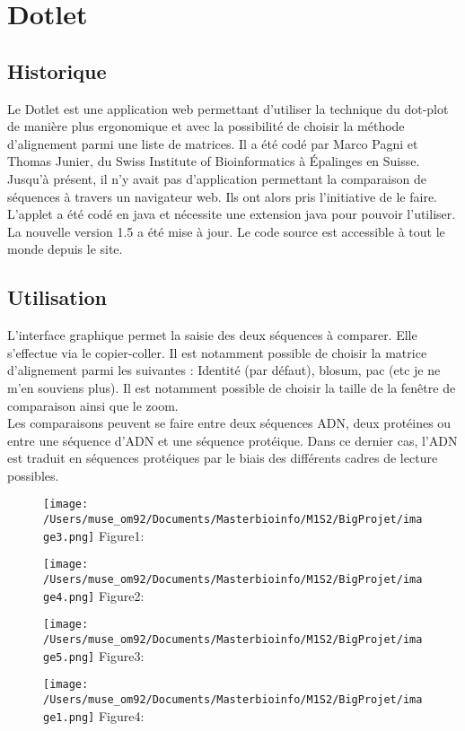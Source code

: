\documentclass{report}
\begin{document}


\chapter{Dotlet}

\section{Historique}

Le Dotlet est une application web permettant d'utiliser la technique du dot-plot de manière plus ergonomique et avec la possibilité de choisir la méthode d'alignement parmi une liste de matrices. 
Il a été codé par Marco Pagni et Thomas Junier, du Swiss Institute of Bioinformatics à Épalinges en Suisse. Jusqu'à présent, il n'y avait pas d'application permettant la comparaison de séquences à travers un navigateur web. Ils ont alors pris l'initiative de le faire.\\
L'applet a été codé en java et nécessite une extension java pour pouvoir l'utiliser. La nouvelle version 1.5 a été mise à jour. Le code source est accessible à tout le monde depuis le site.\\


\section{Utilisation}

L'interface graphique permet la saisie des deux séquences à comparer. Elle s'effectue via le copier-coller. Il est notamment possible de choisir la matrice d'alignement parmi les suivantes : Identité (par défaut), blosum, pac (etc je ne m'en souviens plus). Il est notamment possible de choisir la taille de la fenêtre de comparaison ainsi que le zoom. \\
Les comparaisons peuvent se faire entre deux séquences ADN, deux protéines ou entre une séquence d'ADN et une séquence protéique. Dans ce dernier cas, l'ADN est traduit en séquences protéiques par le biais des différents cadres de lecture possibles.\\

\begin{figure}[!h]
\centering
\texttt{[image: /Users/muse\_om92/Documents/Masterbioinfo/M1S2/BigProjet/image3.png]}
Figure1: 
\end{figure}
\begin{figure}[!h]
\centering
\texttt{[image: /Users/muse\_om92/Documents/Masterbioinfo/M1S2/BigProjet/image4.png]}
Figure2:
\end{figure}
\begin{figure}[!h]
\centering
\texttt{[image: /Users/muse\_om92/Documents/Masterbioinfo/M1S2/BigProjet/image5.png]}
Figure3:
\end{figure}
\begin{figure}[!h]
\centering
\texttt{[image: /Users/muse\_om92/Documents/Masterbioinfo/M1S2/BigProjet/image1.png]}
Figure4:
\end{figure}
\end{document}
